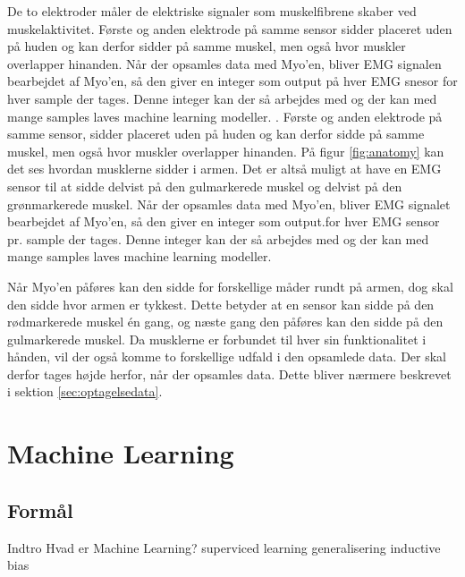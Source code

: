 De to elektroder måler de elektriske signaler som muskelfibrene skaber ved muskelaktivitet\citep{RefWorks:13}. Første og anden elektrode på samme sensor sidder placeret uden på huden og kan derfor sidder på samme muskel, men også hvor muskler overlapper hinanden. Når der opsamles data med Myo'en, bliver EMG signalen bearbejdet af Myo'en, så den giver en integer som output på hver EMG snesor for hver sample der tages. Denne integer kan der så arbejdes med og der kan med mange samples laves machine learning modeller.
\citep{RefWorks:13}. Første og anden elektrode på samme sensor, sidder placeret uden på huden og kan derfor sidde på samme muskel, men også hvor muskler overlapper hinanden. På figur \ref{fig:anatomy} kan det ses hvordan musklerne sidder i armen. Det er altså muligt at have en EMG sensor til at sidde delvist på den gulmarkerede muskel og delvist på den grønmarkerede muskel. Når der opsamles data med Myo'en, bliver EMG signalet bearbejdet af Myo'en, så den giver en integer som output.for hver EMG sensor pr. sample der tages. Denne integer kan der så arbejdes med og der kan med mange samples laves machine learning modeller.


Når Myo'en påføres kan den sidde for forskellige måder rundt på armen, dog skal den sidde hvor armen er tykkest. Dette betyder at en sensor kan sidde på den rødmarkerede muskel én gang, og næste gang den påføres kan den sidde på den gulmarkerede muskel. Da musklerne er forbundet til hver sin funktionalitet i hånden, vil der også komme to forskellige udfald i den opsamlede data. Der skal derfor tages højde herfor, når der opsamles data. Dette bliver nærmere beskrevet i sektion \ref{sec:optagelsedata}.

\section{Machine Learning}
\label{sec:machineLearning}

\subsection{Formål}

Indtro
Hvad er Machine Learning?
superviced learning
generalisering
inductive bias
\\

